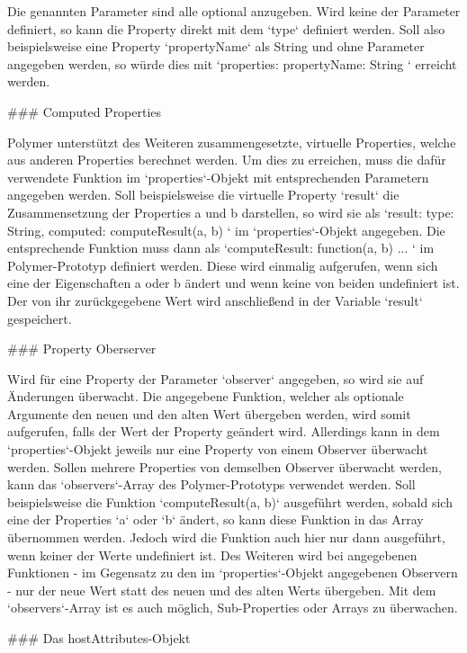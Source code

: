 Die genannten Parameter sind alle optional anzugeben. Wird keine der Parameter definiert, so kann die Property direkt mit dem `type` definiert werden. Soll also beispielsweise eine Property `propertyName` als String und ohne Parameter angegeben werden, so würde dies mit `properties: { propertyName: String }` erreicht werden.


### Computed Properties

Polymer unterstützt des Weiteren zusammengesetzte, virtuelle Properties, welche aus anderen Properties berechnet werden. Um dies zu erreichen, muss die dafür verwendete Funktion im `properties`-Objekt mit entsprechenden Parametern angegeben werden. Soll beispielsweise die virtuelle Property `result` die Zusammensetzung der Properties a und b darstellen, so wird sie als `result: { type: String, computed: computeResult(a, b) }` im `properties`-Objekt angegeben. Die entsprechende Funktion muss dann als `computeResult: function(a, b) { ... }` im Polymer-Prototyp definiert werden. Diese wird einmalig aufgerufen, wenn sich eine der Eigenschaften a oder b ändert und wenn keine von beiden undefiniert ist. Der von ihr zurückgegebene Wert wird anschließend in der Variable `result` gespeichert.


### Property Oberserver

Wird für eine Property der Parameter `observer` angegeben, so wird sie auf Änderungen überwacht. Die angegebene Funktion, welcher als optionale Argumente den neuen und den alten Wert übergeben werden, wird somit aufgerufen, falls der Wert der Property geändert wird. Allerdings kann in dem `properties`-Objekt jeweils nur eine Property von einem Observer überwacht werden. Sollen mehrere Properties von demselben Observer überwacht werden, kann das `observers`-Array des Polymer-Prototyps verwendet werden. Soll beispielsweise die Funktion `computeResult(a, b)` ausgeführt werden, sobald sich eine der Properties `a` oder `b` ändert, so kann diese Funktion in das Array übernommen werden. Jedoch wird die Funktion auch hier nur dann ausgeführt, wenn keiner der Werte undefiniert ist. Des Weiteren wird bei angegebenen Funktionen - im Gegensatz zu den im `properties`-Objekt angegebenen Observern - nur der neue Wert statt des neuen und des alten Werts übergeben. Mit dem `observers`-Array ist es auch möglich, Sub-Properties oder Arrays zu überwachen.


### Das hostAttributes-Objekt

